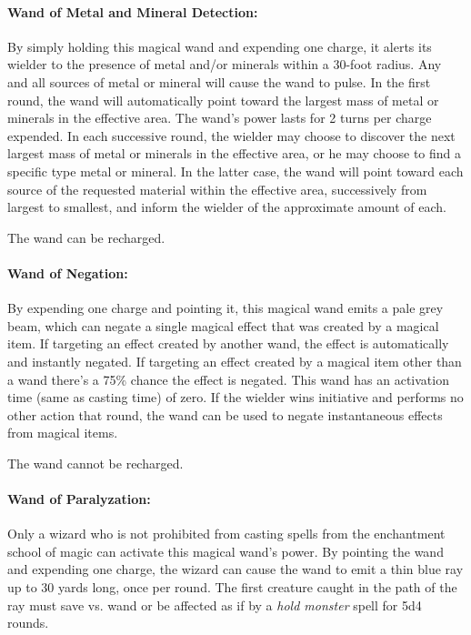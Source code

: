 \begin{multicols}{2}
\paragraph{Wand of Metal and Mineral Detection:} By simply holding this magical wand and expending one charge, it alerts its wielder to the presence of metal and/or minerals within a 30-foot radius.  Any and all sources of metal or mineral will cause the wand to pulse.  In the first round, the wand will automatically point toward the largest mass of metal or minerals in the effective area.  The wand's power lasts for 2 turns per charge expended.  In each successive round, the wielder may choose to discover the next largest mass of metal or minerals in the effective area, or he may choose to find a specific type metal or mineral.  In the latter case, the wand will point toward each source of the requested material within the effective area, successively from largest to smallest, and inform the wielder of the approximate amount of each.

The wand can be recharged.

\paragraph{Wand of Negation:} By expending one charge and pointing it, this magical wand emits a pale grey beam, which can negate a single magical effect that was created by a magical item.  If targeting an effect created by another wand, the effect is automatically and instantly negated.  If targeting an effect created by a magical item other than a wand there's a 75\% chance the effect is negated.  This wand has an activation time (same as casting time) of zero.  If the wielder wins initiative and performs no other action that round, the wand can be used to negate instantaneous effects from magical items.

The wand cannot be recharged.

\paragraph{Wand of Paralyzation:} Only a wizard who is not prohibited from casting spells from the enchantment school of magic can activate this magical wand's power.  By pointing the wand and expending one charge, the wizard can cause the wand to emit a thin blue ray up to 30 yards long, once per round.  The first creature caught in the path of the ray must save vs. wand or be affected as if by a \textit{hold monster} spell for 5d4 rounds.  


\end{multicols}
